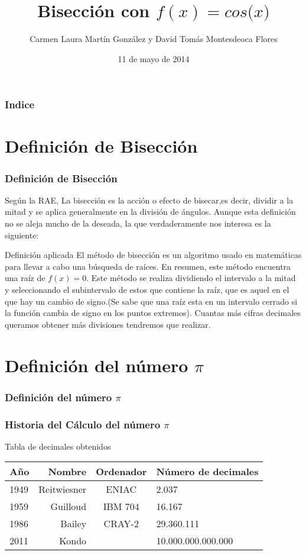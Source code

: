 \documentclass{beamer}
\title[La bisección de $f(x)=cos($\pi$x)$ en \textsc{Beamer}]{Bisección con $f(x)=cos($\pi$x)$}
\author[D. Montesdeoca y  L. Martín]{Carmen Laura Martín González
y
David Tomás Montesdeoca Flores}
\date[11/05/14]{11 de mayo de 2014}
\begin{document}
\begin{frame}
\titlepage
\end{frame}

\begin{frame}
\frametitle{Indice}
\tableofcontents[pausesections]

\end{frame}

\section{Definición de Bisección}

\begin{frame}
\frametitle{Definición de Bisección}

Según la RAE, La bisección es la acción o efecto de bisecar,es decir, dividir a la mitad y se aplica generalmente en la división de ángulos. Aunque esta definición no se aleja mucho de la deseada, la que verdaderamente nos interesa es la siguiente:

\begin{block}{Definición aplicada}
El método de bisección es un algoritmo usado en matemáticas para llevar a cabo una búsqueda de raíces. En resumen, este método encuentra una raíz de $f(x)=0$. Este método se realiza dividiendo el intervalo a la mitad y seleccionando el subintervalo de estos que contiene la raíz, que es aquel en el que hay un cambio de signo.(Se sabe que una raíz esta en un intervalo cerrado si la función cambia de signo en los puntos extremos). Cuantas más cifras decimales queramos obtener más divisiones tendremos que realizar.
\end{block} 

\end{frame}

\section{Definición del número $\pi$}

\begin{frame}
\frametitle{Definición del número $\pi$}


\end{frame}

\begin{frame}
\frametitle{Historia del Cálculo del número $\pi$}
\begin{block}{Tabla de decimales obtenidos}
\begin{table}{}
\begin{tabular}{lrcl}
Año   &  Nombre       &  Ordenador &  Número de decimales \\ \hline
1949  &  Reitwiesner  &  ENIAC     &  2.037  \\ \hline
1959  &  Guilloud     &  IBM 704   &  16.167  \\ \hline
1986  &  Bailey       &  CRAY-2    &  29.360.111 \\ \hline
2011  &  Kondo        &            &  10.000.000.000.000 \\ \hline
\end{tabular}
\end {table}
\end{block}
\end{frame}
\end{document}
